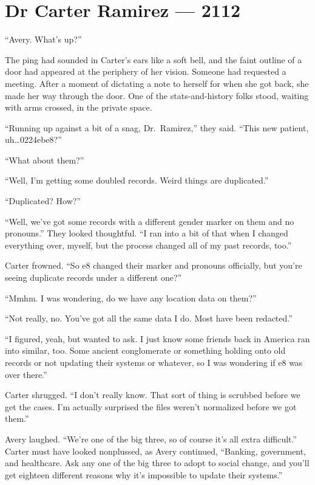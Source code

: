 \hypertarget{dr-carter-ramirez-2112}{%
\chapter*{Dr Carter Ramirez — 2112}\label{dr-carter-ramirez-2112}}

``Avery. What's up?''

The ping had sounded in Carter's ears like a soft bell, and the faint outline of a door had appeared at the periphery of her vision. Someone had requested a meeting. After a moment of dictating a note to herself for when she got back, she made her way through the door. One of the stats-and-history folks stood, waiting with arms crossed, in the private space.

``Running up against a bit of a snag, Dr.~Ramirez,'' they said. ``This new patient, uh\ldots{}0224ebe8?''

``What about them?''

``Well, I'm getting some doubled records. Weird things are duplicated.''

``Duplicated? How?''

``Well, we've got some records with a different gender marker on them and no pronouns.'' They looked thoughtful. ``I ran into a bit of that when I changed everything over, myself, but the process changed all of my past records, too.''

Carter frowned. ``So e8 changed their marker and pronouns officially, but you're seeing duplicate records under a different one?''

``Mmhm. I was wondering, do we have any location data on them?''

``Not really, no. You've got all the same data I do. Most have been redacted.''

``I figured, yeah, but wanted to ask. I just know some friends back in America ran into similar, too. Some ancient conglomerate or something holding onto old records or not updating their systems or whatever, so I was wondering if e8 was over there.''

Carter shrugged. ``I don't really know. That sort of thing is scrubbed before we get the cases. I'm actually surprised the files weren't normalized before we got them.''

Avery laughed. ``We're one of the big three, so of course it's all extra difficult.'' Carter must have looked nonplussed, as Avery continued, ``Banking, government, and healthcare. Ask any one of the big three to adopt to social change, and you'll get eighteen different reasons why it's impossible to update their systems.''

